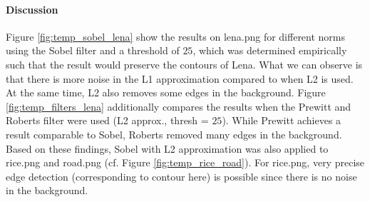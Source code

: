 \documentclass{article}
\begin{document}
\paragraph{Discussion} Figure \ref{fig:temp_sobel_lena} show the results on \textsf{lena.png} for different norms using the Sobel filter and a threshold of $25$, which was determined empirically such that the result would preserve the contours of Lena. What we can observe is that there is more noise in the L1 approximation compared to when L2 is used. At the same time, L2 also removes some edges in the background. Figure \ref{fig:temp_filters_lena} additionally compares the results when the Prewitt and Roberts filter were used (L2 approx., \textsf{thresh} = $25$). While Prewitt achieves a result comparable to Sobel, Roberts removed many edges in the background. Based on these findings, Sobel with L2 approximation was also applied to \textsf{rice.png} and \textsf{road.png} (cf. Figure \ref{fig:temp_rice_road}). For \textsf{rice.png}, very precise edge detection (corresponding to contour here) is possible since there is no noise in the background. 
\end{document}
